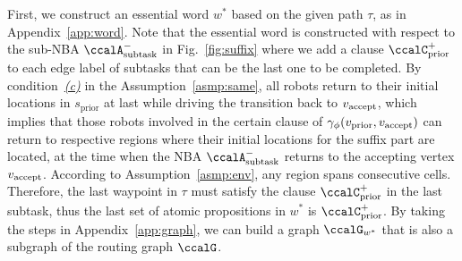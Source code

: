 \documentclass[Afour,sageh,times]{sagej}
\newcommand{\auto}[1]{\ccalA_{\textup{#1}}}
\newcommand{\vertex}[1]{v_{\textup{#1}}}
\begin{document}
{{First, we construct an essential word $w^*$ based on the given path $\tau$, as in Appendix~\ref{app:word}.  Note that the essential word is constructed with respect to the sub-NBA $\auto{subtask}^-$ in Fig.~\ref{fig:suffix} where we add a  clause $\ccalC_{\text{prior}}^+$ to each edge label of subtasks that can be the last one to be completed. By condition~\hyperref[asmp:c]{\it (c)} in the Assumption~\ref{asmp:same}, all robots return to their initial locations in $s_{\text{prior}}$ at last while driving the transition back to $\vertex{accept}$, which implies that those robots involved in the certain clause of $\gamma_\phi(\vertex{prior}, \vertex{accept})$ can return to respective regions where their initial locations for the suffix part are located, at the  time when the NBA $\auto{subtask}^-$ returns to the accepting vertex $\vertex{accept}$. According to Assumption~\ref{asmp:env}, any region spans consecutive cells. Therefore, the last waypoint in $\tau$ must satisfy the clause $\ccalC_{\text{prior}}^+$ in the last subtask, thus the last set of atomic propositions in $w^*$ is $\ccalC_{\text{prior}}^+$. By taking the steps in Appendix~\ref{app:graph}, we can build a graph $\ccalG_{w^*}$ that is also a subgraph of the routing graph $\ccalG$.

}}
\end{document}
